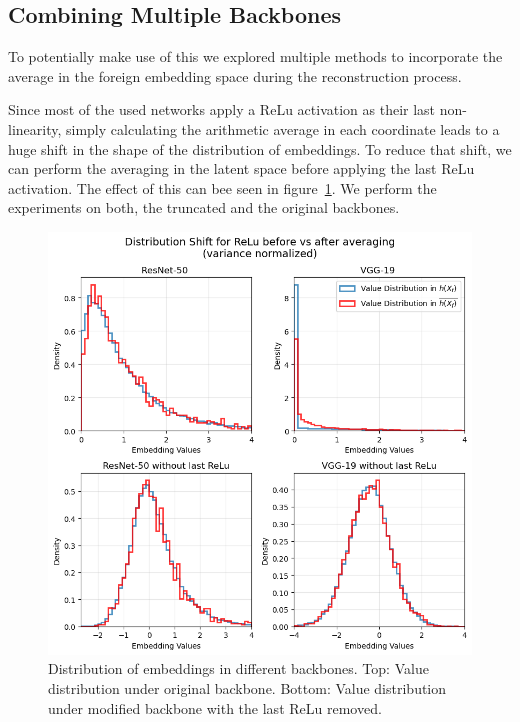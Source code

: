 \documentclass[10pt,twocolumn]{article}
\begin{document}
\subsection{Combining Multiple Backbones}\label{combining_backbones}
To potentially make use of this we explored multiple methods to incorporate the average in the foreign embedding space during the reconstruction process.

Since most of the used networks apply a ReLu activation as their last non-linearity, simply calculating the arithmetic average in each coordinate leads to a huge shift in the shape of the distribution of embeddings.
To reduce that shift, we can perform the averaging in the latent space before applying the last ReLu activation.
The effect of this can bee seen in figure~\ref{fig:relu_norelu_distribution_shift}.
We perform the experiments on both, the truncated and the original backbones.

\begin{figure}[ht]
    \centering
    \includegraphics[width=\linewidth]{figures/relu-norelu-distribution-shift.png}
    \caption{
       Distribution of embeddings in different backbones.
       Top: Value distribution under original backbone.
       Bottom: Value distribution under modified backbone with the last ReLu removed.
    }
    \label{fig:relu_norelu_distribution_shift}
\end{figure}
\end{document}
